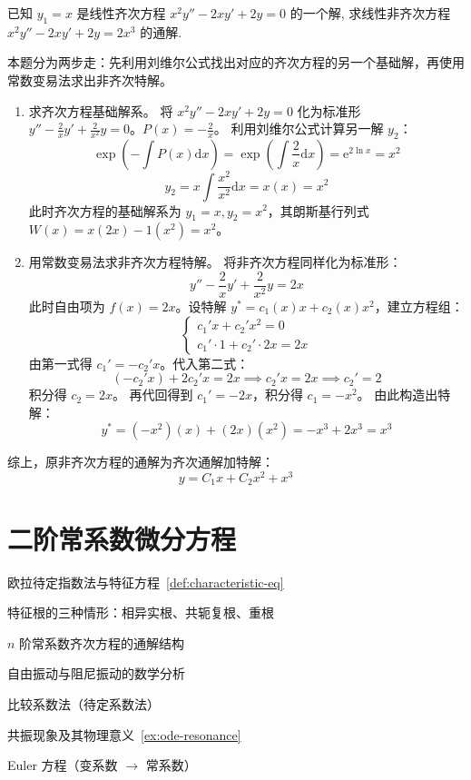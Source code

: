 \documentclass[lang=cn,11pt]{elegantbook}
\begin{document}
\begin{exercise}[常数变易法的综合应用]
已知 $y_1=x$ 是线性齐次方程 $x^2y''-2xy'+2y=0$ 的一个解, 求线性非齐次方程 $x^2y''-2xy'+2y=2x^3$ 的通解.
\end{exercise}
\begin{solution}
本题分为两步走：先利用刘维尔公式找出对应的齐次方程的另一个基础解，再使用常数变易法求出非齐次特解。
\begin{enumerate}
\item 求齐次方程基础解系。
将 $x^2y''-2xy'+2y=0$ 化为标准形 $y'' - \frac{2}{x}y' + \frac{2}{x^2}y = 0$。$P(x) = -\frac{2}{x}$。
利用刘维尔公式计算另一解 $y_2$：
\[
\exp\left(-\int P(x)\mathrm{d}x\right) = \exp\left(\int \frac{2}{x}\mathrm{d}x\right) = \mathrm{e}^{2\ln x} = x^2
\]
\[
y_2 = x \int \frac{x^2}{x^2} \mathrm{d}x = x(x) = x^2
\]
此时齐次方程的基础解系为 $y_1=x, y_2=x^2$，其朗斯基行列式 $W(x) = x(2x) - 1(x^2) = x^2$。
\item 用常数变易法求非齐次方程特解。
将非齐次方程同样化为标准形：
\[
y'' - \frac{2}{x}y' + \frac{2}{x^2}y = 2x
\]
此时自由项为 $f(x) = 2x$。设特解 $y^* = c_1(x)x + c_2(x)x^2$，建立方程组：
\[
\begin{cases}
c_1' x + c_2' x^2 = 0 \\
c_1' \cdot 1 + c_2' \cdot 2x = 2x
\end{cases}
\]
由第一式得 $c_1' = -c_2' x$。代入第二式：
\[
(-c_2' x) + 2c_2' x = 2x \implies c_2' x = 2x \implies c_2' = 2
\]
积分得 $c_2 = 2x$。
再代回得到 $c_1' = -2x$，积分得 $c_1 = -x^2$。
由此构造出特解：
\[
y^* = (-x^2)(x) + (2x)(x^2) = -x^3 + 2x^3 = x^3
\]
\end{enumerate}
综上，原非齐次方程的通解为齐次通解加特解：
\[
\boxed{y = C_1 x + C_2 x^2 + x^3}
\]
\end{solution}


\section{二阶常系数微分方程}

\begin{introduction}
  \item 欧拉待定指数法与特征方程~\ref{def:characteristic-eq}
  \item 特征根的三种情形：相异实根、共轭复根、重根
  \item $n$ 阶常系数齐次方程的通解结构~
  \item 自由振动与阻尼振动的数学分析
  \item 比较系数法（待定系数法）
  \item 共振现象及其物理意义~\ref{ex:ode-resonance}
  \item Euler 方程（变系数 $\to$ 常系数）
\end{introduction}
\end{document}
